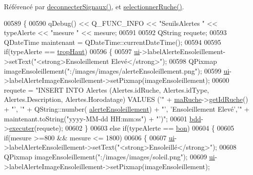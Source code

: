 Référencé par \hyperlink{class_ruche_ihm_a348a76106f3072dd31a382c6025b8113}{deconnecter\+Signaux()}, et \hyperlink{class_ruche_ihm_a7324ae6ea574ccdad47783f466933157}{selectionner\+Ruche()}.


\begin{DoxyCode}
00589 \{
00590     qDebug() << Q\_FUNC\_INFO << \textcolor{stringliteral}{"SeuilsAlertes "} << typeAlerte << \textcolor{stringliteral}{"mesure "} << mesure;
00591 
00592     QString requete;
00593     QDateTime maintenant = QDateTime::currentDateTime();
00594 
00595     \textcolor{keywordflow}{if}(typeAlerte == \hyperlink{parametres_8h_aaa6de8207c94675264c90b10b613368dabc650d9700ae19f2696e6a6e3f9ab067}{tropHaut})
00596     \{
00597         \hyperlink{class_ruche_ihm_a64786058bd7f88ca2f1e9743bb27c25b}{ui}->labelAlerteEnsoleillement->setText(\textcolor{stringliteral}{"<strong>Ensoleillement Elevé</strong>"});
00598         QPixmap imageEnsoleillement(\textcolor{stringliteral}{":/images/images/alerteEnsoleillement.png"});
00599         \hyperlink{class_ruche_ihm_a64786058bd7f88ca2f1e9743bb27c25b}{ui}->labelAlerteImageEnsoleillement->setPixmap(imageEnsoleillement);
00600         requete = \textcolor{stringliteral}{"INSERT INTO Alertes (Alertes.idRuche, Alertes.idType, Alertes.Description,
       Alertes.Horodatage) VALUES ('"} + \hyperlink{class_ruche_ihm_a43a6b1fa31f4fba58d919daae3707b38}{maRuche}->\hyperlink{class_ruche_a9f2de5ef29557ec7a53d5e22df34d164}{getIdRuche}() + \textcolor{stringliteral}{"', '"} + QString::number(
      \hyperlink{parametres_8h_a83a725fd153179a2bd97afcc8307737ba256a82c8886c1902dc7a078868434f83}{alerteEnsoleillement}) + \textcolor{stringliteral}{"', 'Ensoleillement Elevé','"} + maintenant.toString(\textcolor{stringliteral}{"yyyy-MM-dd
        HH:mm:ss"}) + \textcolor{stringliteral}{"')"};
00601         \hyperlink{class_ruche_ihm_a0851936fe212e8d40538264f09749153}{bdd}->\hyperlink{class_base_de_donnees_aa8de5f8f8bb17edc43f5c0ee33712081}{executer}(requete);
00602     \}
00603     \textcolor{keywordflow}{else} \textcolor{keywordflow}{if}(typeAlerte == \hyperlink{parametres_8h_aaa6de8207c94675264c90b10b613368da5ac8ec3b54d90a07c6bb5a77ef971821}{bon})
00604     \{
00605         \textcolor{keywordflow}{if}(mesure >=800 && mesure <= 1800)
00606         \{
00607             \hyperlink{class_ruche_ihm_a64786058bd7f88ca2f1e9743bb27c25b}{ui}->labelAlerteEnsoleillement->setText(\textcolor{stringliteral}{"<strong>Ensoleillé</strong>"});
00608             QPixmap imageEnsoleillement(\textcolor{stringliteral}{":/images/images/soleil.png"});
00609             \hyperlink{class_ruche_ihm_a64786058bd7f88ca2f1e9743bb27c25b}{ui}->labelAlerteImageEnsoleillement->setPixmap(imageEnsoleillement);

\end{DoxyCode}
